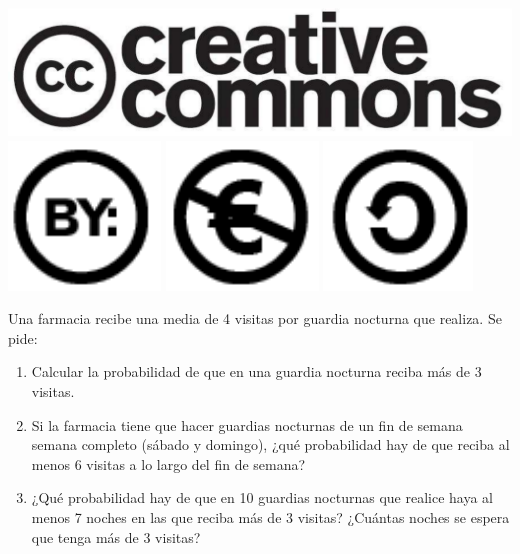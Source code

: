 \documentclass[aspectratio=149,10pt,xcolor=dvipsnames,t]{beamer}
\begin{document}
\begin{frame}[c]
\begin{center}
\biskip
\includegraphics[scale=0.07]{img/cc-logo}
\includegraphics[scale=0.2]{img/cc-by}
\includegraphics[scale=0.2]{img/cc-e}
\includegraphics[scale=0.2]{img/cc-c}
\end{center}
\end{frame}

\begin{frame}[c]
\large
Una farmacia recibe una media de 4 visitas por guardia nocturna que realiza. Se pide:
\begin{enumerate}
\item Calcular la probabilidad de que en una guardia nocturna reciba más de 3 visitas.
\item Si la farmacia tiene que hacer guardias nocturnas de un fin de semana semana completo (sábado y domingo), ¿qué
probabilidad hay de que reciba al menos 6 visitas a lo largo del fin de semana?
\item ¿Qué probabilidad hay de que en 10 guardias nocturnas que realice haya al menos 7 noches en las que reciba más de
3 visitas? ¿Cuántas noches se espera que tenga más de 3 visitas?
\end{enumerate} 
\end{frame}
\end{document}
